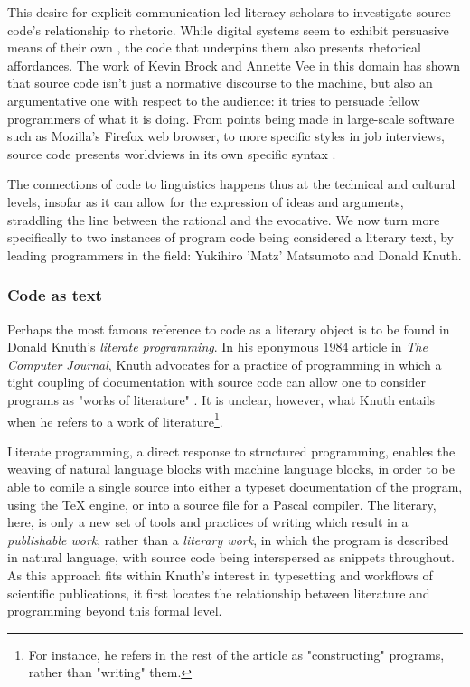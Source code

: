 This desire for explicit communication led literacy scholars to investigate source code's relationship to rhetoric. While digital systems seem to exhibit persuasive means of their own \citep{bogost_rhetoric_2008} \citep{frasca_simulation_2013}, the code that underpins them also presents rhetorical affordances. The work of Kevin Brock and Annette Vee in this domain has shown that source code isn't just a normative discourse to the machine, but also an argumentative one with respect to the audience: it tries to persuade fellow programmers of what it is doing. From points being made in large-scale software such as Mozilla's Firefox web browser, to more specific styles in job interviews, source code presents worldviews in its own specific syntax \citep{brock_rhetorical_2019}.

The connections of code to linguistics happens thus at the technical and cultural levels, insofar as it can allow for the expression of ideas and arguments, straddling the line between the rational and the evocative. We now turn more specifically to two instances of program code being considered a literary text, by leading programmers in the field: Yukihiro 'Matz' Matsumoto and Donald Knuth.

\subsubsection{Code as text}
\label{subsubsec:code-text}

Perhaps the most famous reference to code as a literary object is to be found in Donald Knuth's \emph{literate programming}. In his eponymous 1984 article in \emph{The Computer Journal}, Knuth advocates for a practice of programming in which a tight coupling of documentation with source code can allow one to consider programs as "works of literature" \citep{knuth_literate_1984}. It is unclear, however, what Knuth entails when he refers to a work of literature\footnote{For instance, he refers in the rest of the article as "constructing" programs, rather than "writing" them.}.

Literate programming, a direct response to structured programming, enables the weaving of natural language blocks with machine language blocks, in order to be able to comile a single source into either a typeset documentation of the program, using the TeX engine, or into a source file for a Pascal compiler. The literary, here, is only a new set of tools and practices of writing which result in a \emph{publishable work}, rather than a \emph{literary work}, in which the program is described in natural language, with source code being interspersed as snippets throughout. As this approach fits within Knuth's interest in typesetting and workflows of scientific publications, it first locates the relationship between literature and programming beyond this formal level.

